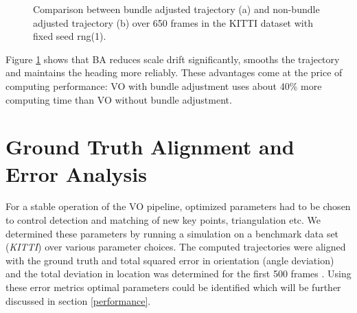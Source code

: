 \begin{figure}[htp]
	\centering
	
	\hspace{2cm}
	\caption{Comparison between bundle adjusted trajectory (a) and non-bundle adjusted trajectory (b) over 650 frames in the KITTI dataset with fixed seed rng(1).}
	\label{fig:BAeffect}
\end{figure}


Figure \ref{fig:BAeffect} shows that BA reduces scale drift significantly, smooths the trajectory and maintains the heading more reliably. These advantages come at the price of computing performance: VO with bundle adjustment uses about 40\% more computing time than VO without bundle adjustment.

\section{Ground Truth Alignment and Error Analysis}
\label{simulation}

For a stable operation of the VO pipeline, optimized parameters had to be chosen to control detection and matching of new key points, triangulation etc. 
We determined these parameters by running a simulation  on a benchmark data set (\emph{KITTI}) over various parameter choices. The computed trajectories were aligned with the ground truth and total squared error in orientation (angle deviation) and the total deviation in location was determined for the first 500 frames . Using these error metrics optimal parameters could be identified which will be further discussed in section \ref{performance}.